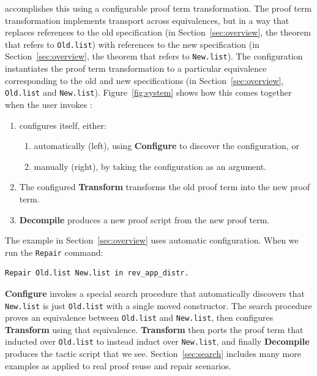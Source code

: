 \toolname accomplishes this using a configurable proof term transformation.
The proof term transformation implements transport across equivalences,
but in a way that replaces references to the old specification (in Section~\ref{sec:overview}, the theorem that refers to \lstinline{Old.list})
with references to the new specification (in Section~\ref{sec:overview}, the theorem that refers to \lstinline{New.list}).
The configuration instantiates the proof term transformation to a particular equivalence corresponding to the old and new 
specifications (in Section~\ref{sec:overview}, \lstinline{Old.list} and \lstinline{New.list}).
Figure~\ref{fig:system} shows how this comes together when the user invokes \toolname:

\begin{enumerate}
\item \toolname configures itself, either:
\begin{enumerate}
\item automatically (left), using \textbf{Configure} to discover the configuration, or
\item manually (right), by taking the configuration as an argument.
\end{enumerate}
\item The configured \textbf{Transform} transforms the old proof term into the new proof term.
\item \textbf{Decompile} produces a new proof script from the new proof term.
\end{enumerate}

The example in Section~\ref{sec:overview} uses automatic configuration. When we run the \lstinline{Repair} command:

\begin{lstlisting}
Repair Old.list New.list in rev_app_distr.
\end{lstlisting}
\textbf{Configure} invokes a special search procedure that automatically discovers that \lstinline{New.list}
is just \lstinline{Old.list} with a single moved constructor.
The search procedure proves an equivalence between \lstinline{Old.list} and \lstinline{New.list},
then configures \textbf{Transform} using that equivalence.
\textbf{Transform} then ports the proof term that inducted over \lstinline{Old.list}
to instead induct over \lstinline{New.list}, and finally
\textbf{Decompile} produces the tactic script that we see.
Section~\ref{sec:search} includes many more examples as applied to real proof reuse and repair scenarios.


